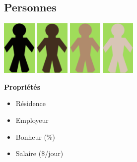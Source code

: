 \documentclass[11pt]{report}
\begin{document}
\subsection{Personnes}
\begin{center}
	\begin{minipage}{0.6\textwidth}
		\begin{flushright}
			\includegraphics[height=100px]{person_0}
			\includegraphics[height=100px]{person_1}
			\includegraphics[height=100px]{person_2}
			\includegraphics[height=100px]{person_3}
		\end{flushright}
	\end{minipage}
	\begin{minipage}{0.35\textwidth}
		\textbf{Propriétés}
		\begin{itemize}
			\item Résidence
			\item Employeur
			\item Bonheur (\%)
			\item Salaire (\$/jour)
		\end{itemize}
	\end{minipage}
\end{center}
\end{document}
